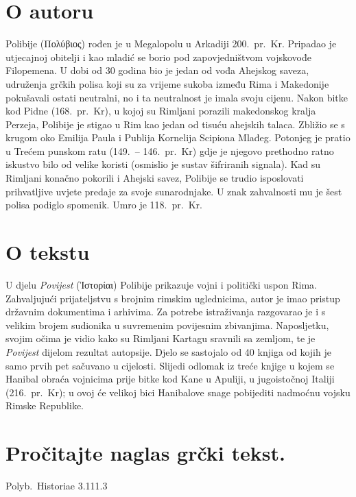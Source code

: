 \section*{O autoru}

Polibije \textgreek[variant=ancient]{(Πολύβιος)} rođen je u Megalopolu u Arkadiji 200.\ pr.~Kr. Pripadao je utjecajnoj obitelji i kao mladić se borio pod zapovjedništvom vojskovođe Filopemena. U dobi od 30 godina bio je jedan od vođa Ahejskog saveza, udruženja grčkih polisa koji su za vrijeme sukoba između Rima i Makedonije pokušavali ostati neutralni, no i ta neutralnost je imala svoju cijenu. Nakon bitke kod Pidne (168.\ pr.~Kr), u kojoj su Rimljani porazili makedonskog kralja Perzeja, Polibije je stigao u Rim kao jedan od tisuću ahejskih talaca. Zbližio se s krugom oko Emilija Paula i Publija Kornelija Scipiona Mlađeg. Potonjeg je pratio u Trećem punskom ratu (149.\ – 146.\ pr.~Kr) gdje je njegovo prethodno ratno iskustvo bilo od velike koristi (osmislio je sustav šifriranih signala). Kad su Rimljani konačno pokorili i Ahejski savez, Polibije se trudio isposlovati prihvatljive uvjete predaje za svoje sunarodnjake. U znak zahvalnosti mu je šest polisa podiglo spomenik. Umro je 118.\ pr.~Kr.

\section*{O tekstu}

U djelu \textit{Povijest} \textgreek[variant=ancient]{(Ἱστορίαι)} Polibije prikazuje vojni i politički uspon Rima. Zahvaljujući prijateljstvu s brojnim rimskim uglednicima, autor je imao pristup državnim dokumentima i arhivima. Za potrebe istraživanja razgovarao je i s velikim brojem sudionika u suvremenim povijesnim zbivanjima. Naposljetku, svojim očima je vidio kako su Rimljani Kartagu sravnili sa zemljom, te je \textit{Povijest} dijelom rezultat autopsije. Djelo se sastojalo od 40 knjiga od kojih je samo prvih pet sačuvano u cijelosti. Slijedi odlomak iz treće knjige u kojem se Hanibal obraća vojnicima prije bitke kod Kane u Apuliji, u jugoistočnoj Italiji (216.\ pr.~Kr); u ovoj će velikoj bici Hanibalove snage pobijediti nadmoćnu vojsku Rimske Republike.


\section*{Pročitajte naglas grčki tekst.}
Polyb.\ Historiae 3.111.3


